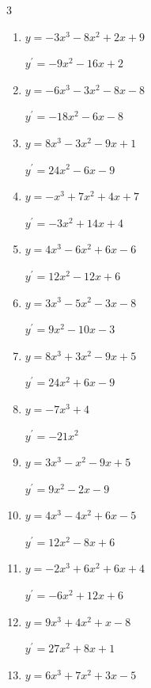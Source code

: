 \begin{multicols}{3}
\begin{enumerate}
  \item $y=-3x^{3}-8x^{2}+2x+9$

        $\displaystyle y^{\prime}=-9x^{2}-16x+2$

  \item $y=-6x^{3}-3x^{2}-8x-8$

        $\displaystyle y^{\prime}=-18x^{2}-6x-8$

  \item $y=8x^{3}-3x^{2}-9x+1$

        $\displaystyle y^{\prime}=24x^{2}-6x-9$

  \item $y=-x^{3}+7x^{2}+4x+7$

        $\displaystyle y^{\prime}=-3x^{2}+14x+4$

  \item $y=4x^{3}-6x^{2}+6x-6$

        $\displaystyle y^{\prime}=12x^{2}-12x+6$

  \item $y=3x^{3}-5x^{2}-3x-8$

        $\displaystyle y^{\prime}=9x^{2}-10x-3$

  \item $y=8x^{3}+3x^{2}-9x+5$

        $\displaystyle y^{\prime}=24x^{2}+6x-9$

  \item $y=-7x^{3}+4$

        $\displaystyle y^{\prime}=-21x^{2}$

  \item $y=3x^{3}-x^{2}-9x+5$

        $\displaystyle y^{\prime}=9x^{2}-2x-9$

  \item $y=4x^{3}-4x^{2}+6x-5$

        $\displaystyle y^{\prime}=12x^{2}-8x+6$

  \item $y=-2x^{3}+6x^{2}+6x+4$

        $\displaystyle y^{\prime}=-6x^{2}+12x+6$

  \item $y=9x^{3}+4x^{2}+x-8$

        $\displaystyle y^{\prime}=27x^{2}+8x+1$

\columnbreak %

\resetques

  \item $y=6x^{3}+7x^{2}+3x-5$


\end{enumerate}
\end{multicols}
